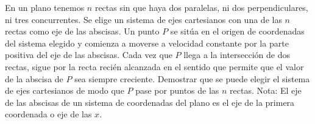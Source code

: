 En un plano tenemos $n$ rectas sin que haya dos paralelas, ni dos perpendiculares, ni tres concurrentes. Se elige un sistema de ejes cartesianos con una de las $n$ rectas como eje de las abscisas. Un punto $P$ se sitúa en el origen de coordenadas del sistema elegido y comienza a moverse a velocidad constante por la parte positiva del eje de las abscisas. Cada vez que $P$ llega a la intersección de dos rectas, sigue por la recta recién alcanzada en el sentido que permite que el valor de la abscisa de $P$ sea siempre creciente. Demostrar que se puede elegir el sistema de ejes cartesianos de modo que $P$ pase por puntos de las $n$ rectas. \newline 
Nota: El eje de las abscisas de un sistema de coordenadas del plano es el eje de la primera coordenada o eje de las $x$.
